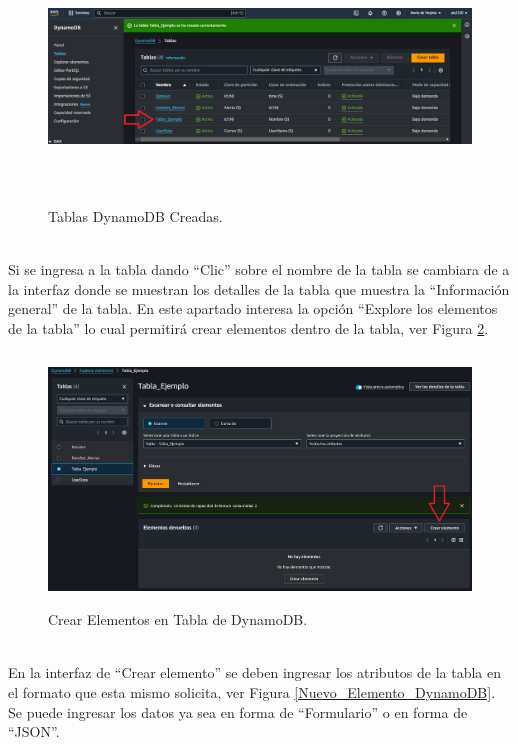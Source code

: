 \documentclass[a4paper,10pt, oneside, titlepage]{article}
\begin{document}
	\begin{figure}[!h]
		\centering
		\includegraphics[width = 1\linewidth, height = 6.7cm]{Tablas_DynamoDB_Creada.png}
		\caption{Tablas DynamoDB Creadas.}
		\label{Tablas_DynamoDB_Creada}
	\end{figure} \\
	\indent Si se ingresa a la tabla dando ``Clic'' sobre el nombre de la tabla se cambiara de a la interfaz donde se muestran los detalles de la tabla que muestra la ``Información general'' de la tabla. En este apartado interesa la opción ``Explore los elementos de la tabla'' lo cual permitirá crear elementos dentro de la tabla, ver Figura \ref{Crear_Elemento_Tabla_DynamoDB}.
	\begin{figure}[!h]
		\centering
		\includegraphics[width = 1\linewidth, height = 6.7cm]{Crear_Elemento_Tabla_DynamoDB.png}
		\caption{Crear Elementos en Tabla de DynamoDB.}
		\label{Crear_Elemento_Tabla_DynamoDB}
	\end{figure} \\
	\indent En la interfaz de ``Crear elemento'' se deben ingresar los atributos de la tabla en el formato que esta mismo solicita, ver Figura \ref{Nuevo_Elemento_DynamoDB}. Se puede ingresar los datos ya sea en forma de ``Formulario'' o en forma de ``JSON''.
\end{document}
